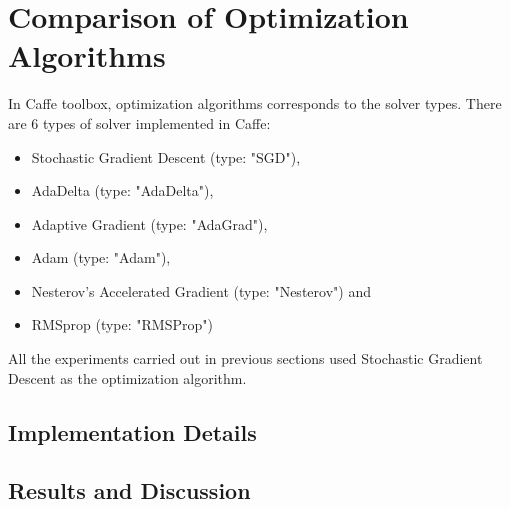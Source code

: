\chapter{Comparison of Optimization Algorithms}
\label{chap:solver}
In Caffe toolbox, optimization algorithms corresponds to the solver types. There are 6 types of solver implemented in Caffe:
\begin{itemize}
	\item Stochastic Gradient Descent (type: "SGD"),
\item	AdaDelta (type: "AdaDelta"),
\item	Adaptive Gradient (type: "AdaGrad"),
\item	Adam (type: "Adam"),
\item	Nesterov’s Accelerated Gradient (type: "Nesterov") and
\item	RMSprop (type: "RMSProp")
\end{itemize}
All the experiments carried out in previous sections used Stochastic Gradient Descent as the optimization algorithm.
 
\section{Implementation Details}

\section{Results and Discussion}
